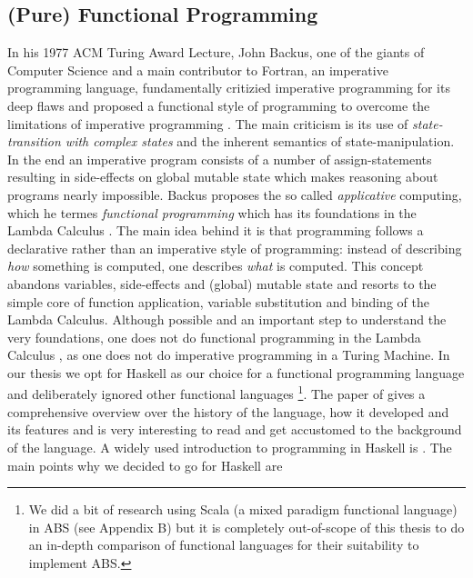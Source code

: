 \subsection{(Pure) Functional Programming}
In his 1977 ACM Turing Award Lecture, John Backus, one of the giants of Computer Science and a main contributor to Fortran, an imperative programming language, fundamentally critizied imperative programming for its deep flaws and proposed a functional style of programming to overcome the limitations of imperative programming \cite{backus_can_1978}. The main criticism is its use of \textit{state-transition with complex states} and the inherent semantics of state-manipulation. In the end an imperative program consists of a number of assign-statements resulting in side-effects on global mutable state which makes reasoning about programs nearly impossible. Backus proposes the so called \textit{applicative} computing, which he termes \textit{functional programming} which has its foundations in the Lambda Calculus \cite{church_calculi_1941}. The main idea behind it is that programming follows a declarative rather than an imperative style of programming: instead of describing \textit{how} something is computed, one describes \textit{what} is computed. This concept abandons variables, side-effects and (global) mutable state and resorts to the simple core of function application, variable substitution and binding of the Lambda Calculus. Although possible and an important step to understand the very foundations, one does not do functional programming in the Lambda Calculus \cite{michaelson_introduction_2011}, as one does not do imperative programming in a Turing Machine. 
In our thesis we opt for Haskell as our choice for a functional programming language and deliberately ignored other functional languages \footnote{We did a bit of research using Scala (a mixed paradigm functional language) in ABS (see Appendix B) but it is completely out-of-scope of this thesis to do an in-depth comparison of functional languages for their suitability to implement ABS.}. The paper of \cite{hudak_history_2007} gives a comprehensive overview over the history of the language, how it developed and its features and is very interesting to read and get accustomed to the background of the language. A widely used introduction to programming in Haskell is \cite{hutton_programming_2016}. The main points why we decided to go for Haskell are

